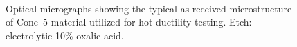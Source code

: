 {\begin{figure}
    \centering
     \\
    \caption[Optical micrographs showing the typical as-received microstructure of Cone~5 Material.]{Optical micrographs showing the typical as-received microstructure of Cone~5 material utilized for hot ductility testing.  Etch: electrolytic 10\% oxalic acid.}
    \label{fig:c5-asreceived}
\end{figure}

}
